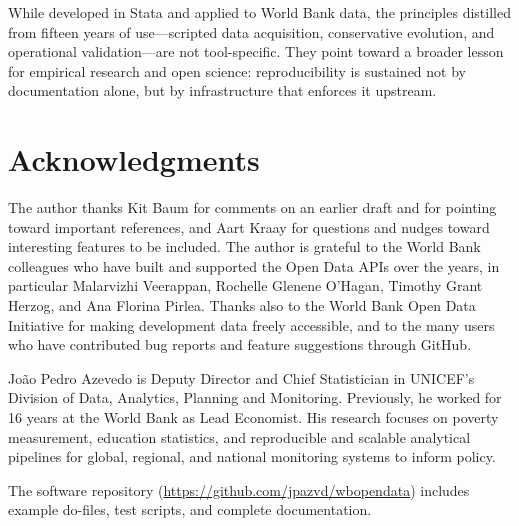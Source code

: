 \documentclass[bib]{statapress}
\begin{document}
While developed in Stata and applied to World Bank data, the principles distilled
from fifteen years of use—scripted data acquisition, conservative evolution, and
operational validation—are not tool-specific. They point toward a broader lesson
for empirical research and open science: reproducibility is sustained not by
documentation alone, but by infrastructure that enforces it upstream.


\section*{Acknowledgments}

The author thanks Kit Baum for comments on an earlier draft and for pointing toward important references, and Aart Kraay for questions and nudges toward interesting features to be included.  The author is grateful to the World Bank colleagues who have built and supported the Open Data APIs over the years, in particular Malarvizhi Veerappan, Rochelle Glenene O'Hagan, Timothy Grant Herzog, and Ana Florina Pirlea.  Thanks also to the World Bank Open Data Initiative for making development data freely accessible, and to the many users who have contributed bug reports and feature suggestions through GitHub.


\nocite{pisati2007spmap,clarke2012worldstat}


\begin{aboutauthors}
Jo\~{a}o Pedro Azevedo is Deputy Director and Chief Statistician in UNICEF's Division of Data, Analytics, Planning and Monitoring. Previously, he worked for 16 years at the World Bank as Lead Economist. His research focuses on poverty measurement, education statistics, and reproducible and scalable analytical pipelines for global, regional, and national monitoring systems to inform policy.

The software repository (\url{https://github.com/jpazvd/wbopendata}) includes example do-files, test scripts, and complete documentation.
\end{aboutauthors}



\appendix
\renewcommand{\thesection}{\Alph{section}}
\end{document}
